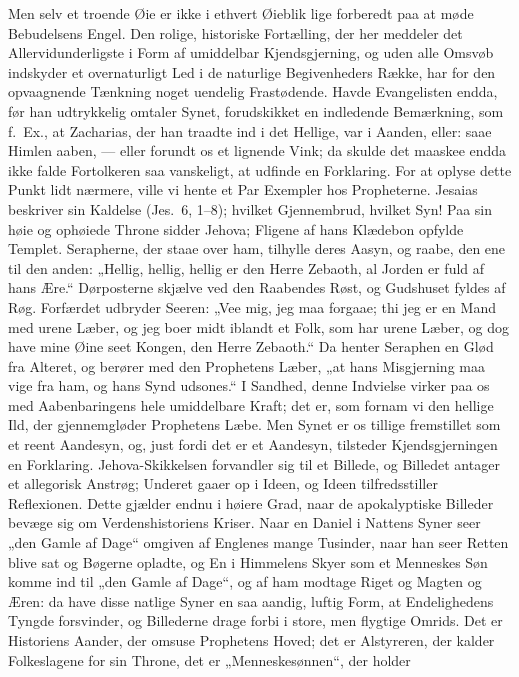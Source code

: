 \documentclass[12pt,a4paper]{book}
\begin{document}
Men selv et troende Øie er ikke i ethvert Øieblik lige forberedt paa at
møde Bebudelsens Engel. Den rolige, historiske Fortælling, der her
meddeler det Allervidunderligste i Form af umiddelbar Kjendsgjerning,
og uden alle Omsvøb indskyder et overnaturligt Led i de naturlige
Begivenheders Række, har for den opvaagnende Tænkning noget uendelig
Frastødende. Havde Evangelisten endda, før han udtrykkelig omtaler
Synet, forudskikket en indledende Bemærkning, som f.\ Ex., at
Zacharias, der han traadte ind i det Hellige, var i Aanden, eller: saae
Himlen aaben, --- eller forundt os et lignende Vink; da skulde det
maaskee endda ikke falde Fortolkeren saa vanskeligt, at udfinde en
Forklaring. For at oplyse dette Punkt lidt nærmere, ville vi hente et
Par Exempler hos Propheterne. Jesaias beskriver sin Kaldelse (Jes.\ 6,
1--8); hvilket Gjennembrud, hvilket Syn! Paa sin høie og ophøiede
Throne sidder Jehova; Fligene af hans Klædebon opfylde Templet.
Serapherne, der staae over ham, tilhylle deres Aasyn, og raabe, den ene
til den anden: „Hellig, hellig, hellig er den Herre Zebaoth, al Jorden
er fuld af hans Ære.“ Dørposterne skjælve ved den Raabendes Røst, og
Gudshuset fyldes af Røg. Forfærdet udbryder Seeren: „Vee mig, jeg maa
forgaae; thi jeg er en Mand med urene Læber, og jeg boer midt iblandt
et Folk, som har urene Læber, og dog have mine Øine seet Kongen, den
Herre Zebaoth.“ Da henter Seraphen en Glød fra Alteret, og berører med
den Prophetens Læber, „at hans Misgjerning maa vige fra ham, og hans
Synd udsones.“ I Sandhed, denne Indvielse virker paa os med
Aabenbaringens hele umiddelbare Kraft; det er,
som fornam vi den hellige Ild, der gjennemgløder Prophetens Læbe. Men
Synet er os tillige fremstillet som et reent Aandesyn, og, just fordi
det er et Aandesyn, tilsteder Kjendsgjerningen en Forklaring.
Jehova-Skikkelsen forvandler sig til et Billede, og Billedet antager et
allegorisk Anstrøg; Underet gaaer op i Ideen, og Ideen tilfredsstiller
Reflexionen. Dette gjælder endnu i høiere Grad, naar de apokalyptiske
Billeder bevæge sig om Verdenshistoriens Kriser. Naar en Daniel i
Nattens Syner seer „den Gamle af Dage“ omgiven af Englenes mange
Tusinder, naar han seer Retten blive sat og Bøgerne opladte, og En i
Himmelens Skyer som et Menneskes Søn komme ind til „den Gamle af Dage“,
og af ham modtage Riget og Magten og Æren: da have disse natlige Syner
en saa aandig, luftig Form, at Endelighedens Tyngde forsvinder, og
Billederne drage forbi i store, men flygtige Omrids. Det er Historiens
Aander, der omsuse Prophetens Hoved; det er Alstyreren, der kalder
Folkeslagene for sin Throne, det er „Menneskesønnen“, der holder
\end{document}
